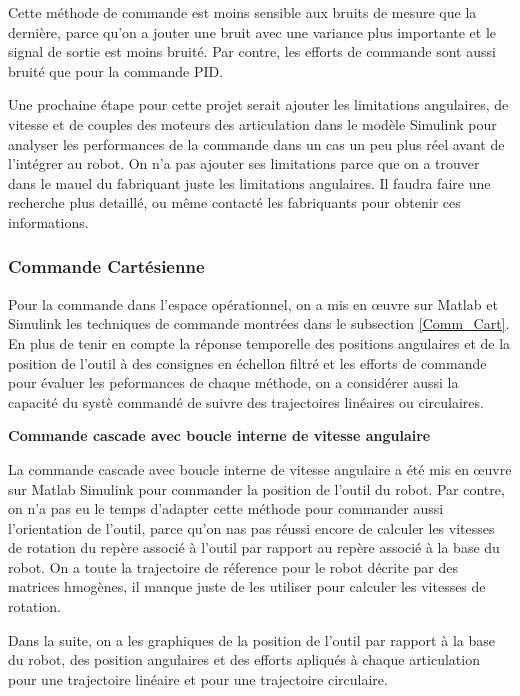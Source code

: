 Cette méthode de commande est moins sensible aux bruits de mesure que la dernière, parce qu'on a jouter une bruit avec une variance plus importante et le signal de sortie est moins bruité. Par contre, les efforts de commande sont aussi bruité que pour la commande PID.

Une prochaine étape pour cette projet serait ajouter les limitations angulaires, de vitesse et de couples des moteurs des articulation dans le modèle Simulink pour analyser les performances de la commande dans un cas un peu plus réel avant de l'intégrer au robot. On n'a pas ajouter ses limitations parce que on a trouver dans le mauel du fabriquant juste les limitations angulaires. Il faudra faire une recherche plus detaillé, ou même contacté les fabriquants pour obtenir ces informations.
\newpage
\subsubsection{Commande Cartésienne}

Pour la commande dans l'espace opérationnel, on a mis en \oe{}uvre sur Matlab et Simulink les techniques de commande montrées dans le subsection \ref{Comm_Cart}. En plus de tenir en compte la réponse temporelle des positions angulaires et de la position de l'outil à des consignes en échellon filtré et les efforts de commande pour évaluer les peformances de chaque méthode, on a considérer aussi la capacité du systè commandé de suivre des trajectoires linéaires ou circulaires.  
\newline

\textbf{Commande cascade avec boucle interne de vitesse angulaire}
\newline

La commande cascade avec boucle interne de vitesse angulaire a été mis en \oe{}uvre sur Matlab Simulink pour commander la position de l'outil du robot. Par contre, on n'a pas eu le temps d'adapter cette méthode pour commander aussi l'orientation de l'outil, parce qu'on nas pas réussi encore de calculer les vitesses de rotation du repère associé à l'outil par rapport au repère associé à la base du robot. On a toute la trajectoire de réference pour le robot décrite par des matrices hmogènes, il manque juste de les utiliser pour calculer les vitesses de rotation.

Dans la suite, on a les graphiques de la position de l'outil par rapport à la base du robot, des position angulaires et des efforts apliqués à chaque articulation pour une trajectoire linéaire et pour une trajectoire circulaire.

